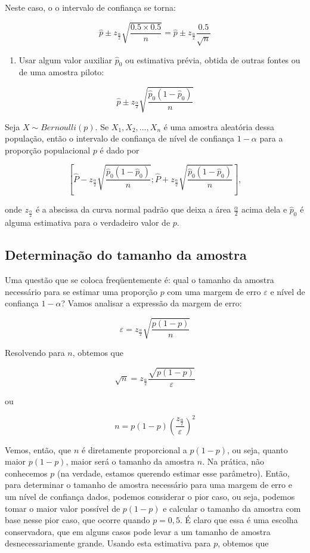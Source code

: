 \documentclass[
]{book}
\providecommand{\tightlist}{%
  \setlength{\itemsep}{0pt}\setlength{\parskip}{0pt}}
\begin{document}
Neste caso, o o intervalo de confiança se torna:

\[\hat p \pm z_{\frac{\alpha}{2}}\sqrt{\frac{0.5\times 0.5}{n}} = \hat p \pm z_{\frac{\alpha}{2}}\frac{0.5}{\sqrt{n}}\]

\begin{enumerate}
\def\labelenumi{\arabic{enumi}.}
\setcounter{enumi}{2}
\tightlist
\item
  Usar algum valor auxiliar \(\hat p_0\) ou estimativa prévia, obtida de outras fontes ou de uma amostra piloto:
\end{enumerate}

\[\hat p \pm z_{\frac{\alpha}{2}}\sqrt{\frac{\hat p_0(1-\hat p_0)}{n}}\]

Seja \(X\sim Bernoulli(p)\). Se \(X_1,X_2,\ldots,X_n\) é uma amostra aleatória dessa população, então o intervalo de confiança de nível de confiança \(1-\alpha\) para a proporção populacional \(p\) é dado por

\[\left[\hat P - z_{\frac{\alpha}{2}}\sqrt{\frac{\hat p_0(1-\hat p_0)}{n}};\hat P + z_{\frac{\alpha}{2}}\sqrt{\frac{\hat p_0(1-\hat p_0)}{n}}\right],\]

onde \(z_{\frac{\alpha}{2}}\) é a abscissa da curva normal padrão que deixa a área \(\frac{\alpha}{2}\) acima dela e \(\hat p_0\) é alguma estimativa para o verdadeiro valor de \(p\).

\hypertarget{determinauxe7uxe3o-do-tamanho-da-amostra-2}{%
\subsection{Determinação do tamanho da amostra}\label{determinauxe7uxe3o-do-tamanho-da-amostra-2}}

Uma questão que se coloca freqüentemente é: qual o tamanho da amostra necessário para se estimar uma proporção \(p\) com uma margem de erro \(\varepsilon\) e nível de confiança \(1-\alpha\)? Vamos analisar a expressão da margem de erro:

\[\varepsilon=z_{\frac{\alpha}{2}}\sqrt{\frac{p(1-p)}{n}}\]

Resolvendo para \(n\), obtemos que

\[\sqrt{n}=z_{\frac{\alpha}{2}}\frac{\sqrt{p(1-p)}}{\varepsilon}\]

ou

\[n=p(1-p)\left(\frac{z_{\frac{\alpha}{2}}}{\varepsilon}\right)^2\]

Vemos, então, que \(n\) é diretamente proporcional a \(p(1-p)\), ou seja, quanto maior \(p(1-p)\), maior será o tamanho da amostra \(n\). Na prática, não conhecemos \(p\) (na verdade, estamos querendo estimar esse parâmetro). Então, para determinar o tamanho de amostra necessário para uma margem de erro e um nível de confiança dados, podemos considerar o pior caso, ou seja, podemos tomar o maior valor possível de \(p(1 - p)\) e calcular o tamanho da amostra com base nesse pior caso, que ocorre quando \(p = 0,5\). É claro que essa é uma escolha conservadora, que em alguns casos pode levar a um tamanho de amostra desnecessariamente grande. Usando esta estimativa para \(p\), obtemos que
\end{document}
